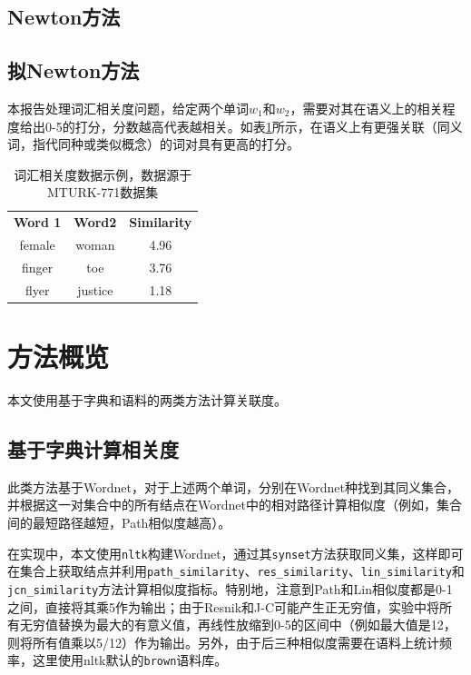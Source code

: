 \documentclass{article}
\begin{document}
\subsection{Newton方法}

\subsection{拟Newton方法}

本报告处理词汇相关度问题，给定两个单词$w_1$和$w_2$，需要对其在语义上的相关程度给出0-5的打分，分数越高代表越相关。如表\ref{tab:dataset_eg}所示，在语义上有更强关联（同义词，指代同种或类似概念）的词对具有更高的打分。

\begin{table}[h]
  \centering
  \begin{tabular}{c c c}
    \toprule
    \bfseries Word 1 & \bfseries Word2 & \bfseries Similarity \\
    \cmidrule(lr){1-3}
    female & woman & 4.96 \\
    finger & toe & 3.76 \\
    flyer & justice & 1.18\\
    \bottomrule
  \end{tabular}
  \caption{词汇相关度数据示例，数据源于MTURK-771数据集}
  \label{tab:dataset_eg}
\end{table}

\section{方法概览}
本文使用基于字典和语料的两类方法计算关联度。
\subsection{基于字典计算相关度}
此类方法基于Wordnet，对于上述两个单词，分别在Wordnet种找到其同义集合，并根据这一对集合中的所有结点在Wordnet中的相对路径计算相似度（例如，集合间的最短路径越短，Path相似度越高）。

在实现中，本文使用\texttt{nltk}构建Wordnet，通过其\texttt{synset}方法获取同义集，这样即可在集合上获取结点并利用\texttt{path\_similarity}、\texttt{res\_similarity}、\texttt{lin\_similarity}和\texttt{jcn\_similarity}方法计算相似度指标。特别地，注意到Path和Lin相似度都是0-1之间，直接将其乘5作为输出；由于Resnik和J-C可能产生正无穷值，实验中将所有无穷值替换为最大的有意义值，再线性放缩到0-5的区间中（例如最大值是12，则将所有值乘以5/12）作为输出。另外，由于后三种相似度需要在语料上统计频率，这里使用nltk默认的\texttt{brown}语料库。
\end{document}

